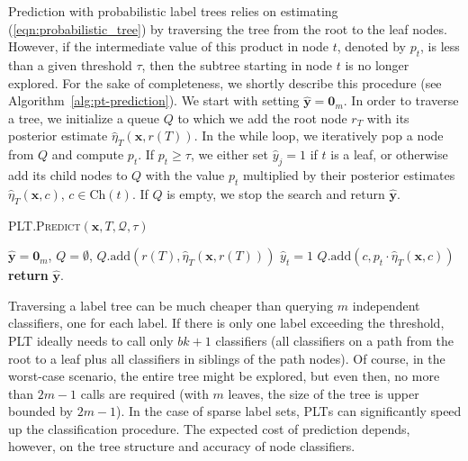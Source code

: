 \documentclass{article}
\newcommand{\Algo}[1]{\textsc{#1}}
\renewcommand{\vec}[1]{\boldsymbol{#1}}
\newcommand{\bx}{\vec{x}}
\newcommand{\by}{\vec{y}}
\newcommand{\heta}{\hat{\eta}}
\newcommand{\Children}[1]{\mathrm{Ch}(#1)}
\begin{document}
Prediction with probabilistic label trees relies on estimating (\ref{eqn:probabilistic_tree}) by traversing the tree from the root to the leaf nodes. However, if the intermediate value of this product in node $t$, denoted by $p_t$, is less than a given threshold $\tau$, then the subtree starting in node $t$ is no longer explored. For the sake of completeness, we shortly describe this procedure (see Algorithm~\ref{alg:pt-prediction}). We start with setting $\hat{\by} = \vec{0}_m$. In order to traverse a tree, we initialize a queue $Q$ to which we add the root node $r_T$ with its posterior estimate $\heta_T(\bx,r(T))$. In the while loop, we iteratively pop a node from $Q$ and compute $p_t$. If $p_t \ge \tau$, we either set $\hat{y}_j = 1$ if $t$ is a leaf, or otherwise add its child nodes to $Q$ with the value $p_t$ multiplied by their posterior estimates $\heta_T(\bx, c)$, $c \in \Children{t}$. If $Q$ is empty, we stop the search and return $\hat{\by}$.

\begin{algorithm}[t]
\caption{\Algo{PLT.Predict}$(\bx, T, \mathcal{Q}, \tau)$}%
\label{alg:pt-prediction}
\begin{algorithmic}[1]
\State $\hat{\by} = \vec{0}_m$, $Q = \emptyset$, $Q.\mathrm{add}(r(T),\heta_T(\bx,r(T)))$ 
\State $\hat{y}_t = 1$ 
\Else
\For{$c \in \Children{t}$} 
\State $Q.\mathrm{add}(c, p_t \cdot \heta_T(\bx,c))$ 
\EndFor
\EndIf
\EndIf
\EndWhile
\State \textbf{return} $\hat{\by}$. 
\end{algorithmic}
\end{algorithm} 


Traversing a label tree can be much cheaper than querying $m$ independent classifiers, one for each label. If there is only one label exceeding the threshold, \Algo{PLT} ideally needs to call only $bk+1$ classifiers (all classifiers on a path from the root to a leaf plus all classifiers in siblings of the path nodes). Of course, in the worst-case scenario, the entire tree might be explored, but even then, no more than $2m-1$ calls are required (with $m$ leaves, the size of the tree is upper bounded by $2m-1$). In the case of sparse label sets, \Algo{PLT}s can significantly speed up the classification procedure. The expected cost of prediction depends, however, on the tree structure and accuracy of node classifiers.
\end{document}
